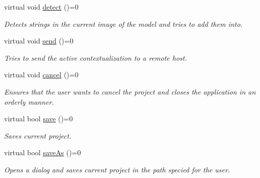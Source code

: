 \begin{DoxyCompactItemize}
virtual void \mbox{\hyperlink{classContextualizationController_a0b79fa3dbd9e95325df5d1bd8507c7a5}{detect}} ()=0
\begin{DoxyCompactList}\small\item\em Detects strings in the current image of the model and tries to add them into. \end{DoxyCompactList}\item 
\mbox{\label{classContextualizationController_a6c22f71d82e58ed54994dd6da55fba5d}} 
virtual void \mbox{\hyperlink{classContextualizationController_a6c22f71d82e58ed54994dd6da55fba5d}{send}} ()=0
\begin{DoxyCompactList}\small\item\em Tries to send the active contextualization to a remote host. \end{DoxyCompactList}\item 
\mbox{\label{classContextualizationController_aef30a9a0c8c18ef27c58cfd71d000502}} 
virtual void \mbox{\hyperlink{classContextualizationController_aef30a9a0c8c18ef27c58cfd71d000502}{cancel}} ()=0
\begin{DoxyCompactList}\small\item\em Ensures that the user wants to cancel the project and closes the application in an orderly manner. \end{DoxyCompactList}\item 
\mbox{\label{classContextualizationController_a4fc34afd044a02b28cf1ccaa16e6d696}} 
virtual bool \mbox{\hyperlink{classContextualizationController_a4fc34afd044a02b28cf1ccaa16e6d696}{save}} ()=0
\begin{DoxyCompactList}\small\item\em Saves current project. \end{DoxyCompactList}\item 
\mbox{\label{classContextualizationController_aacbc46aa9cf35b5e5d159ad829f03c0b}} 
virtual bool \mbox{\hyperlink{classContextualizationController_aacbc46aa9cf35b5e5d159ad829f03c0b}{save\+As}} ()=0
\begin{DoxyCompactList}\small\item\em Opens a dialog and saves current project in the path specied for the user. \end{DoxyCompactList}\item 

\end{DoxyCompactItemize}
